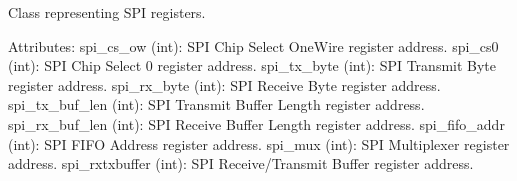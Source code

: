 \documentclass[letterpaper,10pt,english]{sphinxmanual}
\begin{document}

\begin{fulllineitems}
\label{\detokenize{cplddocs:management_flash.spiregisters}}
\pysigstartsignatures
{}
\pysigstopsignatures
\sphinxAtStartPar
Class representing SPI registers.

\sphinxAtStartPar
Attributes:
\sphinxhyphen{} spi\_cs\_ow (int): SPI Chip Select One\sphinxhyphen{}Wire register address.
\sphinxhyphen{} spi\_cs0 (int): SPI Chip Select 0 register address.
\sphinxhyphen{} spi\_tx\_byte (int): SPI Transmit Byte register address.
\sphinxhyphen{} spi\_rx\_byte (int): SPI Receive Byte register address.
\sphinxhyphen{} spi\_tx\_buf\_len (int): SPI Transmit Buffer Length register address.
\sphinxhyphen{} spi\_rx\_buf\_len (int): SPI Receive Buffer Length register address.
\sphinxhyphen{} spi\_fifo\_addr (int): SPI FIFO Address register address.
\sphinxhyphen{} spi\_mux (int): SPI Multiplexer register address.
\sphinxhyphen{} spi\_rxtxbuffer (int): SPI Receive/Transmit Buffer register address.

\end{fulllineitems}

\label{\detokenize{cplddocs:module-management_mcu_uart}}
\end{document}
